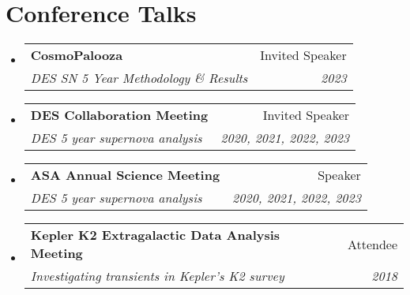 \documentclass[letterpaper,11pt]{article}
\makeatletter
\newcommand{\resumeItem}[1]{
  \item\small{
    {#1 \vspace{-2pt}}
  }
}
\newcommand{\resumeSubheading}[4]{
  \vspace{-2pt}\item
    \begin{tabular*}{0.97\textwidth}[t]{l@{\extracolsep{\fill}}r}
      \textbf{#1} & #2 \\
      \textit{\small#3} & \textit{\small #4} \\
    \end{tabular*}\vspace{-7pt}
}
\newcommand{\resumeSubHeadingListStart}{\begin{itemize}[leftmargin=0.15in, label={}]}
\newcommand{\resumeSubHeadingListEnd}{\end{itemize}}
\newcommand{\resumeItemListStart}{\begin{itemize}}
\newcommand{\resumeItemListEnd}{\end{itemize}\vspace{-5pt}}
\newcommand{\conferenceElement}[5]{%
    \resumeSubHeadingListStart
        \resumeSubheading
            {#1}
            {#2}
            {#3}
            {#4}
            \ifthenelse{\isempty{#5}}{}{%
                \resumeItemListStart
                    \renewcommand*{\do}[1]{\resumeItem{##1}}
                    \docsvlist{#5}%
                \resumeItemListEnd
            }%
    \resumeSubHeadingListEnd
}
\makeatother
\begin{document}
\section{Conference Talks}

    \conferenceElement{CosmoPalooza}{Invited Speaker}{DES SN 5 Year Methodology \& Results}{2023}{}
    \conferenceElement{DES Collaboration Meeting}{Invited Speaker}{DES 5 year supernova analysis}{2020, 2021, 2022, 2023}{}
    \conferenceElement{ASA Annual Science Meeting}{Speaker}{DES 5 year supernova analysis}{2020, 2021, 2022, 2023}{}
    \conferenceElement{Kepler K2 Extragalactic Data Analysis Meeting}{Attendee}{Investigating transients in Kepler's K2 survey}{2018}{}

\end{document}

